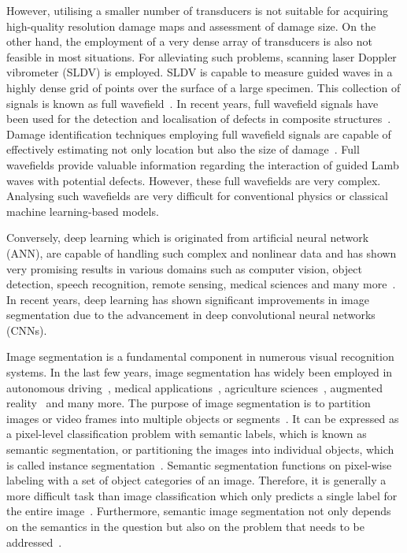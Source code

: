 However, utilising a smaller number of transducers is not suitable for acquiring high-quality resolution damage maps and assessment of damage size.
On the other hand, the employment of a very dense array of transducers is also not feasible in most situations. 
For alleviating such problems, scanning laser Doppler vibrometer (SLDV) is employed. 
SLDV is capable to measure guided waves in a highly dense grid of points over the surface of a large specimen.
This collection of signals is known as full wavefield~\cite{Radzienski2019a}. 
In recent years, full wavefield signals have been used for the detection and localisation of defects in composite
structures~\cite{Radzienski2019a, Girolamo2018a, kudela2018impact,  rogge2013characterization}.
Damage identification techniques employing full wavefield signals are capable of effectively estimating not only location but also the size of damage~\cite{Girolamo2018a, kudela2018impact}.
Full wavefields provide valuable information regarding the interaction of guided Lamb waves with potential defects.  
However, these full wavefields are very complex. 
Analysing such wavefields are very difficult for conventional physics or classical machine learning-based models. 

Conversely, deep learning which is originated from artificial neural network (ANN), are capable of handling such complex and nonlinear data and has shown very promising results in various domains such as computer vision, object detection, speech recognition, remote sensing, medical sciences
and many more~\cite{mohanty2016using, zhang2020well, pashaei2020review}.
In recent years, deep learning has shown significant improvements in image segmentation due to the advancement in deep convolutional neural networks (CNNs).

Image segmentation is a fundamental component in numerous visual recognition
systems. In the last few years, image segmentation has widely been
employed in autonomous driving~\cite{ros2016synthia, li2018real}, medical applications~\cite{taghanaki2021deep}, agriculture sciences~\cite{milioto2018real}, augmented reality~\cite{miksik2015semantic} and many more. 
The purpose of image segmentation is to partition images or video frames into multiple objects or segments~\cite{szeliski2010computer}.
It can be expressed as a pixel-level classification problem with semantic labels, which is known as semantic segmentation, or partitioning the images into individual objects, which is called instance segmentation~\cite{szeliski2010computer, minaee2021image}. 
Semantic segmentation functions on pixel-wise labeling with a set of object categories of an image. 
Therefore, it is generally a more difficult task than image classification which only predicts a single label for the entire image~\cite{minaee2021image}.
Furthermore, semantic image segmentation not only depends on the semantics in
the question but also on the problem that needs to be addressed~\cite{ghosh2019understanding}.

